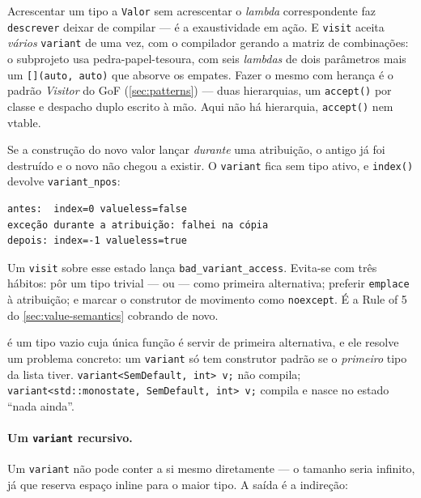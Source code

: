 Acrescentar um tipo a \texttt{Valor} sem acrescentar o \emph{lambda}
correspondente faz \texttt{descrever} deixar de compilar --- é a exaustividade
em ação. E \texttt{visit} aceita \emph{vários} \texttt{variant} de uma vez, com
o compilador gerando a matriz de combinações: o subprojeto usa
pedra-papel-tesoura, com seis \emph{lambdas} de dois parâmetros mais um
\texttt{[](auto, auto)} que absorve os empates. Fazer o mesmo com herança é o
padrão \emph{Visitor} do GoF (\cref{sec:patterns}) --- duas hierarquias, um
\texttt{accept()} por classe e despacho duplo escrito à mão. Aqui não há
hierarquia, \texttt{accept()} nem \gls{vtable}.

\begin{armadilha}
Se a construção do novo valor lançar \emph{durante} uma atribuição, o antigo já
foi destruído e o novo não chegou a existir. O \texttt{variant} fica sem tipo
ativo, e \texttt{index()} devolve \texttt{variant\_npos}:
\begin{lstlisting}[style=bt, language=bash, frame=none,
                   xleftmargin=0pt, xrightmargin=0pt]
antes:  index=0 valueless=false
exceção durante a atribuição: falhei na cópia
depois: index=-1 valueless=true
\end{lstlisting}
Um \texttt{visit} sobre esse estado lança \texttt{bad\_variant\_access}.
Evita-se com três hábitos: pôr um tipo trivial --- ou 
--- como primeira alternativa; preferir \texttt{emplace} à atribuição; e marcar
o construtor de movimento como \texttt{noexcept}. É a Rule of 5 do
\cref{sec:value-semantics} cobrando de novo.
\end{armadilha}

 é um tipo vazio cuja única função é servir de primeira
alternativa, e ele resolve um problema concreto: um \texttt{variant} só tem
construtor padrão se o \emph{primeiro} tipo da lista tiver.
\texttt{variant<SemDefault, int> v;} não compila;
\texttt{variant<std::monostate, SemDefault, int> v;} compila e nasce no estado
``nada ainda''.

\paragraph{Um \texttt{variant} recursivo.} Um \texttt{variant} não pode conter a
si mesmo diretamente --- o tamanho seria infinito, já que reserva espaço inline
para o maior tipo. A saída é a indireção:

